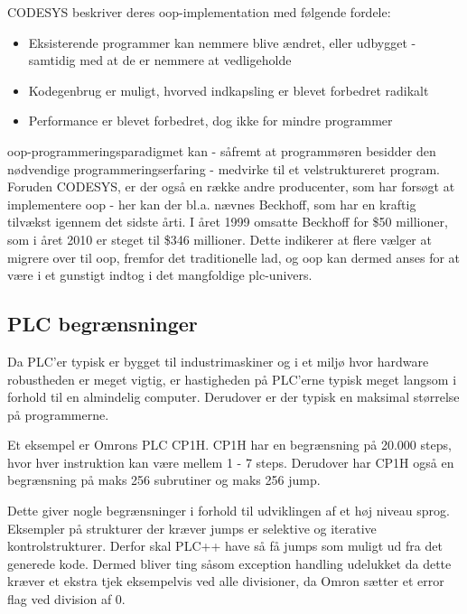 
\noindent CODESYS beskriver deres \gls{oop}-implementation med følgende fordele\cite{codesys-oop-benefits}:
\begin{itemize}
\item Eksisterende programmer kan nemmere blive ændret, eller udbygget - samtidig med at de er nemmere at vedligeholde
\item Kodegenbrug er muligt, hvorved indkapsling er blevet forbedret radikalt
\item Performance er blevet forbedret, dog ikke for mindre programmer
\end{itemize}

\noindent\gls{oop}-programmeringsparadigmet kan - såfremt at programmøren besidder den nødvendige programmeringserfaring - medvirke til et velstruktureret program. Foruden CODESYS, er der også en række andre producenter, som har forsøgt at implementere \gls{oop} - her kan der bl.a. nævnes Beckhoff, som har en kraftig tilvækst igennem det sidste årti. I året 1999 omsatte Beckhoff for \$50 millioner, som i året 2010 er steget til \$346 millioner. Dette indikerer at flere vælger at migrere over til \gls{oop}, fremfor det traditionelle \gls{lad}, og \gls{oop} kan dermed anses for at være i et gunstigt indtog i det mangfoldige \gls{plc}-univers\cite{beckhoff-sold}.

\subsection{PLC begrænsninger}\label{sec:plcprob}
Da PLC'er typisk er bygget til industrimaskiner og i et miljø hvor hardware robustheden er meget vigtig, er hastigheden på PLC'erne typisk meget langsom i forhold til en almindelig computer. Derudover er der typisk en maksimal størrelse på programmerne.

Et eksempel er Omrons PLC CP1H. CP1H har en begrænsning på 20.000 steps, hvor hver instruktion kan være mellem 1 - 7 steps. Derudover har CP1H også en begrænsning på maks 256 subrutiner og maks 256 jump.

Dette giver nogle begrænsninger i forhold til udviklingen af et høj niveau sprog. Eksempler på strukturer der kræver jumps er selektive og iterative kontrolstrukturer. Derfor skal PLC++ have så få jumps som muligt ud fra det generede kode. Dermed bliver ting såsom exception handling udelukket da dette kræver et ekstra tjek eksempelvis ved alle divisioner, da Omron sætter et error flag ved division af 0.

